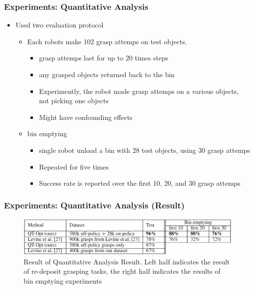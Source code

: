 \documentclass{beamer}
\newcommand{\sixthSec}{Experiments}
\begin{document}
    \begin{frame}
      \frametitle{\sixthSec : Quantitative Analysis}
      \begin{itemize}
        \item Used two evaluation protocol
        \begin{itemize}
          \item Each robots make 102 grasp attemps on test objects.
          \begin{itemize}
            \item grasp attemps last for up to 20 times steps
            \item any grasped objects returned back to the bin
            \item Experimently, the robot made grasp attemps on a various objects, \\
                  not picking one objects
            \item Might have confounding effects
          \end{itemize}
          \item bin emptying
          \begin{itemize}
            \item single robot unload a bin with 28 test objects, using 30 grasp attemps
            \item Repeated for five times
            \item Success rate is reported over the first 10, 20, and 30 grasp attemps
          \end{itemize}
        \end{itemize}
      \end{itemize}
    \end{frame}

    \begin{frame}
      \frametitle{\sixthSec: Quantitative Analysis (Result)}
      \begin{figure}
        \centering
        \includegraphics[width = \linewidth]{Images/QuantitativeAnalysisResult.png}
        \caption{Result of Quantitative Analysis Result. \linebreak
                 Left half indicates the result of re-deposit grasping tasks, the right half indicates the results of bin emptying experiments}
        \label{fig:QuantitativeAnalysisResult}
      \end{figure}
    \end{frame}
\end{document}
